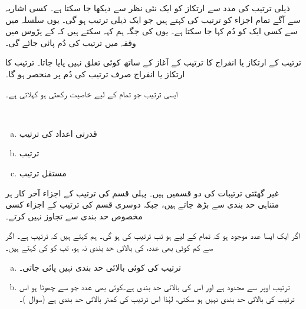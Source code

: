 ذیلی ترتیب  کی مدد سے ارتکاز کو ایک نئی نظر سے دیکھا جا سکتا ہے۔ کسی اشاریہ  سے آگے  تمام اجزاء کو ترتیب  کی  کہتے ہیں جو ایک ذیلی ترتیب ہو گی۔ یوں سلسلہ  میں سے کسی ایک کو دُم کہا جا سکتا ہے۔ یوں  کی جگہ ہم کہہ سکتے ہیں کہ  کے پڑوس میں وقفہ    میں ترتیب  کی دُم پائی جائے گی۔

ترتیب کے  ارتکاز یا انفراج کا ترتیب کے آغاز کے ساتھ کوئی تعلق نہیں پایا جاتا۔ ترتیب  کا ارتکاز یا انفراج صرف ترتیب کی دُم پر منحصر ہو گا۔



ایسی ترتیب  جو تمام  کے لیے  خاصیت رکھتی ہو  کہلاتی ہے۔ 

\\
\begin{enumerate}[a.]
\item
قدرتی اعداد کی ترتیب 
\item
ترتیب  
\item
مستقل ترتیب 
\end{enumerate}

غیر گھٹتی ترتیبات  کی دو قسمیں ہیں۔ پہلی قسم  کی ترتیب کے اجزاء آخر کار ہر متناہی حد بندی سے بڑھ جاتے ہیں،  جبکہ دوسری قسم کی ترتیب  کے اجزاء کسی مخصوص حد بندی سے تجاوز نہیں کرتے۔

اگر ایک ایسا عدد  موجود ہو کہ تمام  کے لیے  ہو تب ترتیب  کی   ہو گی۔ ہم کہتے ہیں کہ 
ترتیب   ہے۔ اگر  سے کم کوئی بھی عدد،  کی بالائی حد بندی نہ ہو، تب  کو  کی 
 کہتے ہیں۔

\begin{enumerate}[a.]
\item
ترتیب  کی کوئی بالائی حد بندی نہیں پائی جاتی۔
\item
ترتیب  اوپر سے محدود ہے اور اس کی بالائی حد بندی  ہے۔کوئی بھی عدد جو  سے چھوٹا ہو اس ترتیب کی بالائی حد بندی نہیں ہو سکتی،  لہٰذا اس ترتیب کی کمتر  بالائی حد بندی  ہے (سوال )۔
\end{enumerate}


